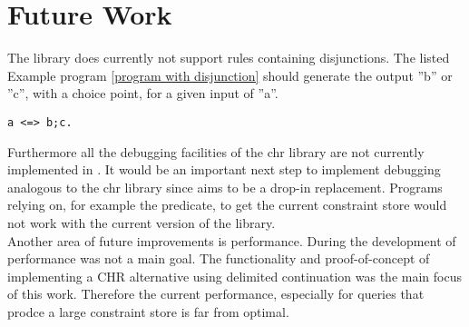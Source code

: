 \section{Future Work}

The {\dhr} library does currently not support rules containing disjunctions. The listed Example program \ref{program with disjunction} should generate the output ''b'' or ''c'', with a choice point, for a given input of ''a''.

\begin{lstlisting}[caption={chr program containing a disjunction}, label={program with disjunction}, frame=single]
a <=> b;c.
\end{lstlisting}

\noindent Furthermore all the debugging facilities of the chr library are not currently implemented in {\dhr}.
It would be an important next step to implement debugging analogous to the chr library since {\dhr} aims to be a drop-in replacement.
Programs relying on, for example the  predicate, to get the current constraint store would not work with the current version of the {\dhr} library.\\

\noindent Another area of future improvements is performance.
During the development of {\dhr} performance was not a main goal.
The functionality and proof-of-concept of implementing a CHR alternative using delimited continuation was the main focus of this work.
Therefore the current performance, especially for queries that prodce a large constraint store is far from optimal.\\


\newpage